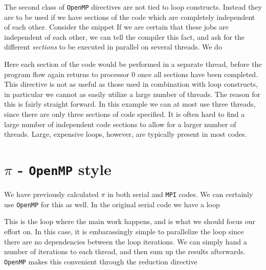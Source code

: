 \documentclass[twoside, 11pt, a4paper]{article}
\begin{document}
The second class of \texttt{OpenMP} directives are not tied to loop constructs. Instead they are to
be used if we have sections of the code which are completely independent of each other. Consider
the snippet 
If we are certain that these jobs are independent of each other, we can tell the compiler
this fact, and ask for the different \emph{sections} to be executed in parallel on
several threads. We do

Here each section of the code would be performed in a separate thread, before
the program flow again returns to processor 0 once all sections have been completed.
This directive is not as useful as those used in combination with loop constructs, in
particular we cannot as easily utilize a large number of threads. The reason for this
is fairly straight forward. In this example we can at most use three threads, since there
are only three sections of code specified. It is often hard to find a large number
of independent code sections to allow for a larger number of threads. Large, expensive loops,
however, are typically present in most codes.

\section{$\pi$ - \texttt{OpenMP} style}
We have previously calculated $\pi$ in both serial and \texttt{MPI} codes. We can certainly use \texttt{OpenMP}
for this as well. In the original serial code we have a loop

This is the loop where the main work happens, and is what we should focus our effort on.
In this case, it is embarassingly simple to parallelize the loop since there are no dependencies between
the loop iterations. We can simply hand a number of iterations to each thread, and then sum up the
results afterwards. \texttt{OpenMP} makes this convenient through the reduction directive

\end{document}
